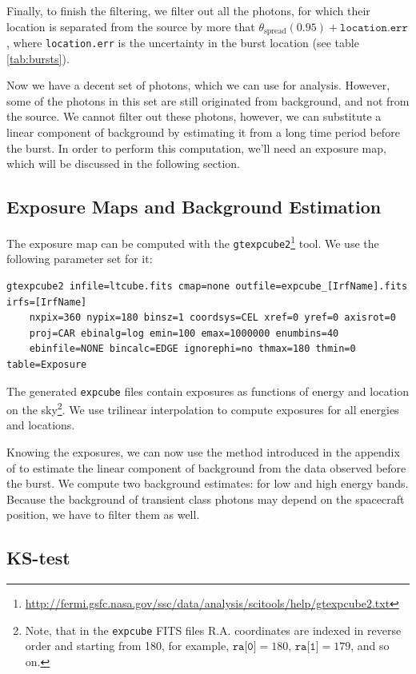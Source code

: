 \documentclass{article}
\begin{document}
Finally, to finish the filtering, we filter out all the photons, for which their location is separated from the source by more that $\theta_{\text{spread}}\left(0.95\right) + \texttt{location.err}$, where \texttt{location.err} is the uncertainty in the burst location (see table \ref{tab:bursts}).

Now we have a decent set of photons, which we can use for analysis. However, some of the photons in this set are still originated from background, and not from the source. We cannot filter out these photons, however, we can substitute a linear component of background by estimating it from a long time period before the burst. In order to perform this computation, we'll need an exposure map, which will be discussed in the following section.

\subsection{Exposure Maps and Background Estimation}

The exposure map can be computed with the \texttt{gtexpcube2}\footnote{\url{http://fermi.gsfc.nasa.gov/ssc/data/analysis/scitools/help/gtexpcube2.txt}} tool. We use the following parameter set for it:
\begin{lstlisting}
gtexpcube2 infile=ltcube.fits cmap=none outfile=expcube_[IrfName].fits irfs=[IrfName]
	nxpix=360 nypix=180 binsz=1 coordsys=CEL xref=0 yref=0 axisrot=0
	proj=CAR ebinalg=log emin=100 emax=1000000 enumbins=40
	ebinfile=NONE bincalc=EDGE ignorephi=no thmax=180 thmin=0 table=Exposure
\end{lstlisting}
The generated \texttt{expcube} files contain exposures as functions of energy and location on the sky\footnote{Note, that in the \texttt{expcube} FITS files R.A. coordinates are indexed in reverse order and starting from 180, for example, $\texttt{ra[0]}=180$, $\texttt{ra[1]}=179$, and so on.}. We use trilinear interpolation to compute exposures for all energies and locations.

Knowing the exposures, we can now use the method introduced in the appendix of \cite{Rubtsov:2011qq} to estimate the linear component of background from the data observed before the burst. We compute two background estimates: for low and high energy bands. Because the background of transient class photons may depend on the spacecraft position, we have to filter them as well.

\subsection{KS-test}
\end{document}
